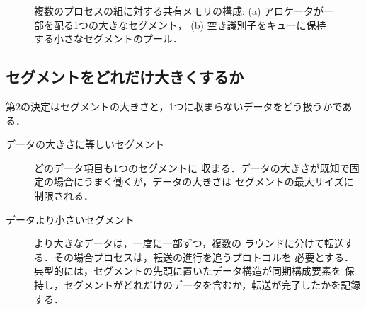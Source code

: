 \documentclass[../main.tex]{subfiles}
\begin{document}
\begin{figure}[htbp]
  \centering
  
  \caption{複数のプロセスの組に対する共有メモリの構成:
    (a) アロケータが一部を配る1つの大きなセグメント，
    (b) 空き識別子をキューに保持する小さなセグメントのプール．}
  \label{fig:l09-segments}
\end{figure}

\subsection{セグメントをどれだけ大きくするか}

第2の決定はセグメントの大きさと，1つに収まらないデータをどう扱うかである．
\begin{description}
  \item[データの大きさに等しいセグメント] どのデータ項目も1つのセグメントに
    収まる．データの大きさが既知で固定の場合にうまく働くが，データの大きさは
    セグメントの最大サイズに制限される．
  \item[データより小さいセグメント] より大きなデータは，一度に一部ずつ，複数の
    ラウンドに分けて転送する．その場合プロセスは，転送の進行を追うプロトコルを
    必要とする．典型的には，セグメントの先頭に置いたデータ構造が同期構成要素を
    保持し，セグメントがどれだけのデータを含むか，転送が完了したかを記録する．
\end{description}
\end{document}
